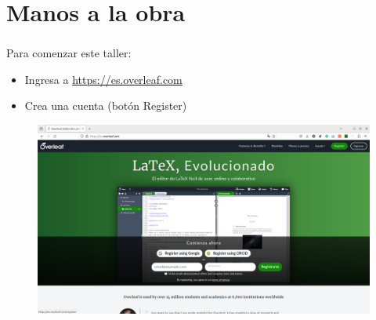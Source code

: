 \documentclass{beamer}
\begin{document}
\section{Manos a la obra}
\begin{frame}
  \frametitle{}
  \begin{center}
    \Large{}
  \end{center}
\end{frame}


\begin{frame}
  \frametitle{}

  Para comenzar este taller:
  \vspace{10px}
  
  \begin{itemize}
  \item Ingresa a \url{https://es.overleaf.com}
  \item Crea una cuenta (bot\'on Register)
  \end{itemize}
  \vspace{10px}
  
  \begin{figure}
    \centering
    \includegraphics[scale=0.17]{img/overleaf.png}
  \end{figure}

\end{frame}

\end{document}
